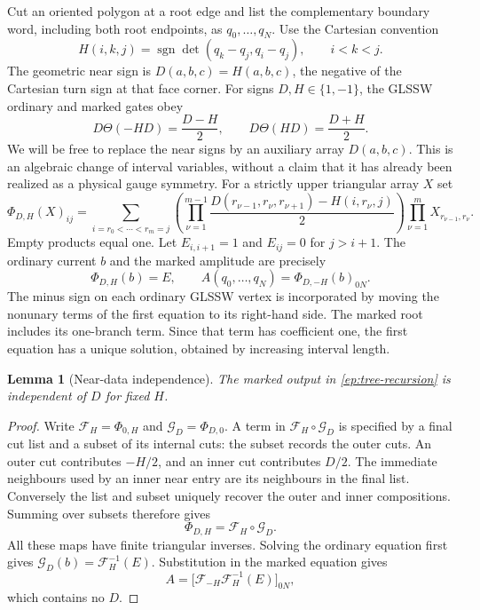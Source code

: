 \documentclass[11pt,letterpaper]{article}
\numberwithin{equation}{section}
\newtheorem{lemma}[theorem]{Lemma}
\theoremstyle{definition}
\theoremstyle{remark}
\DeclareMathOperator{\sgn}{sgn}
\begin{document}
Cut an oriented polygon at a root edge and list the complementary boundary
word, including both root endpoints, as $q_0,\ldots,q_N$. Use the Cartesian convention
\begin{equation}
 H(i,k,j)=\sgn\det(q_k-q_j,q_i-q_j),\qquad i<k<j.
 \label{ep:H}
\end{equation}
The geometric near sign is $D(a,b,c)=H(a,b,c)$, the negative of the
Cartesian turn sign at that face corner. For signs $D,H\in\{1,-1\}$,
the GLSSW ordinary and marked gates obey
\begin{equation}
 D\Theta(-HD)=\frac{D-H}{2},\qquad
 D\Theta(HD)=\frac{D+H}{2}.
 \label{ep:linear-gates}
\end{equation}
We will be free to replace the near signs by an auxiliary array
$D(a,b,c)$. This is an algebraic change of interval variables, without a
claim that it has already been realized as a physical gauge symmetry.
For a strictly upper triangular array $X$ set
\begin{equation}
 \Phi_{D,H}(X)_{ij}=
 \sum_{i=r_0<\cdots<r_m=j}
 \left(\prod_{\nu=1}^{m-1}
 \frac{D(r_{\nu-1},r_\nu,r_{\nu+1})-H(i,r_\nu,j)}{2}\right)
 \prod_{\nu=1}^{m}X_{r_{\nu-1},r_\nu}.
 \label{ep:Phi}
\end{equation}
Empty products equal one.  Let $E_{i,i+1}=1$ and $E_{ij}=0$ for
$j>i+1$.  The ordinary current $b$ and the marked amplitude are precisely
\begin{equation}
 \Phi_{D,H}(b)=E,\qquad
 A(q_0,\ldots,q_N)=\Phi_{D,-H}(b)_{0N}.
 \label{ep:tree-recursion}
\end{equation}
The minus sign on each ordinary GLSSW vertex is incorporated by moving the
nonunary terms of the first equation to its right-hand side.  The marked
root includes its one-branch term.  Since that term has coefficient one,
the first equation has a unique solution, obtained by increasing interval
length.

\begin{lemma}[Near-data independence]
\label{ep:gauge}
The marked output in \eqref{ep:tree-recursion} is independent of $D$ for
fixed $H$.
\end{lemma}
\begin{proof}
Write $\mathcal F_H=\Phi_{0,H}$ and $\mathcal G_D=\Phi_{D,0}$.
A term in $\mathcal F_H\circ\mathcal G_D$ is specified by a final cut
list and a subset of its internal cuts: the subset records the outer
cuts.  An outer cut contributes $-H/2$, and an inner cut contributes
$D/2$.  The immediate neighbours used by an inner near entry are its
neighbours in the final list.  Conversely the list and subset uniquely
recover the outer and inner compositions.  Summing over subsets therefore
gives
\begin{equation}
 \Phi_{D,H}=\mathcal F_H\circ\mathcal G_D.
 \label{ep:factorization}
\end{equation}
All these maps have finite triangular inverses.  Solving the ordinary
equation first gives $\mathcal G_D(b)=\mathcal F_H^{-1}(E)$.
Substitution in the marked equation gives
\begin{equation}
 A=\bigl[\mathcal F_{-H}\mathcal F_H^{-1}(E)\bigr]_{0N},
 \label{ep:near-free}
\end{equation}
which contains no $D$.
\end{proof}
\end{document}
